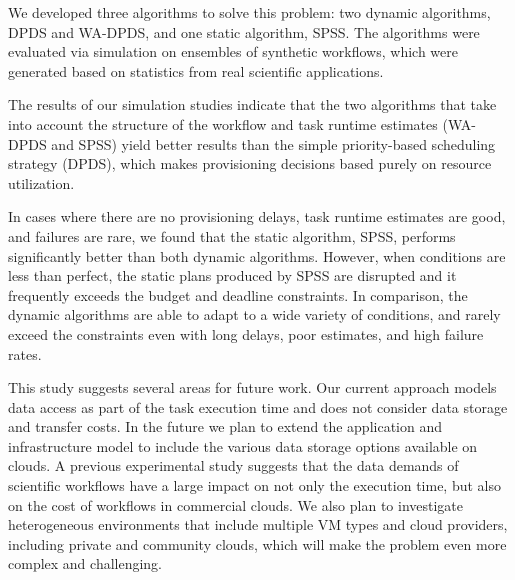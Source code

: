 \documentclass[conference]{IEEEtran}
\begin{document}
We developed three algorithms to solve this problem: two dynamic algorithms, DPDS and WA-DPDS, and one static algorithm, SPSS. The algorithms were evaluated via simulation on ensembles of synthetic workflows, which were generated based on statistics from real scientific applications.

The results of our simulation studies indicate that the two algorithms that take into account the structure of the workflow and task runtime estimates (WA-DPDS and SPSS) yield better results than the simple priority-based scheduling strategy (DPDS), which makes provisioning decisions based purely on resource utilization.

In cases where there are no provisioning delays, task runtime estimates are good, and failures are rare, we found that the static algorithm, SPSS, performs significantly better than both dynamic algorithms. However, when conditions are less than perfect, the static plans produced by SPSS are disrupted and it frequently exceeds the budget and deadline constraints. In comparison, the dynamic algorithms are able to adapt to a wide variety of conditions, and rarely exceed the constraints even with long delays, poor estimates, and high failure rates.



This study suggests several areas for future work. Our current approach models data access as part of the task execution time and does not consider data storage and transfer costs. In the future we plan to extend the application and infrastructure model to  include the various data storage options available on clouds. A previous experimental study \cite{Juve2010} suggests that the data demands of scientific workflows have a large impact on not only the execution time, but also on the cost of workflows in commercial clouds. We also plan to investigate heterogeneous environments that include multiple VM types and cloud providers, including private and community clouds, which will make the problem even more complex and challenging.
\end{document}

